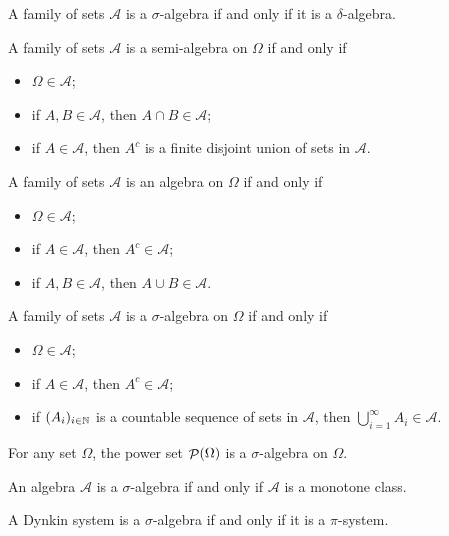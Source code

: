 \begin{lemma}
A family of sets $\mathcal{A}$ is a $\sigma$-algebra \textup{if and only if} it is a $\delta$-algebra.
\end{lemma}

\begin{lemma} \label{lemma:setAlgebraCriteria}
A family of sets $\mathcal{A}$ is a semi-algebra on $\Omega$ \textup{if and only if}
\begin{itemize}
\item $\Omega\in\mathcal{A}$;
\item if $A,B\in \mathcal{A}$, then $A\cap B\in \mathcal{A}$;
\item if $A\in \mathcal{A}$, then $A^c$ is a finite disjoint union of sets in $\mathcal{A}$.
\end{itemize}
A family of sets $\mathcal{A}$ is an algebra on $\Omega$ \textup{if and only if}
\begin{itemize}
\item $\Omega\in\mathcal{A}$;
\item if $A\in \mathcal{A}$, then $A^c\in \mathcal{A}$;
\item if $A,B\in \mathcal{A}$, then $A\cup B\in \mathcal{A}$.
\end{itemize}
A family of sets $\mathcal{A}$ is a $\sigma$-algebra on $\Omega$ \textup{if and only if}
\begin{itemize}
\item $\Omega\in\mathcal{A}$;
\item if $A\in \mathcal{A}$, then $A^c\in \mathcal{A}$;
\item if $(A_i)_{i\in\mathbb{N}}$ is a countable sequence of sets in $\mathcal{A}$, then $\bigcup_{i=1}^\infty A_i\in \mathcal{A}$.
\end{itemize}
\end{lemma}

\begin{example}
For any set $\Omega$, the power set $\mathop{\mathcal{P}}(\Omega)$ is a $\sigma$-algebra on $\Omega$.
\end{example}

\begin{lemma} \label{lemma:algebraMonotoneClass}
An algebra $\mathcal{A}$ is a $\sigma$-algebra \textup{if and only if} $\mathcal{A}$ is a monotone class.
\end{lemma}
\begin{lemma} \label{lemma:DynkinPiSystem}
A Dynkin system is a $\sigma$-algebra \textup{if and only if} it is a $\pi$-system.
\end{lemma}


